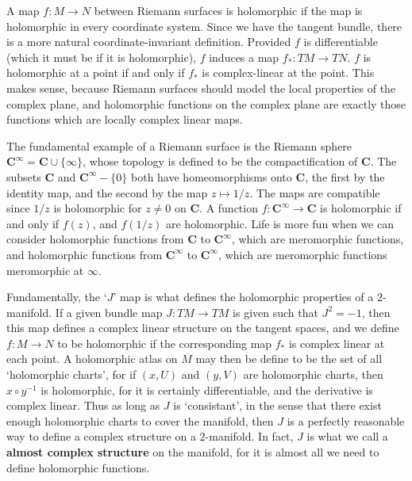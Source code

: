 A map $f: M \to N$ between Riemann surfaces is holomorphic if the map is holomorphic in every coordinate system. Since we have the tangent bundle, there is a more natural coordinate-invariant definition. Provided $f$ is differentiable (which it must be if it is holomorphic), $f$ induces a map $f_*: TM \to TN$. $f$ is holomorphic at a point if and only if $f_*$ is complex-linear at the point. This makes sense, because Riemann surfaces should model the local properties of the complex plane, and holomorphic functions on the complex plane are exactly those functions which are locally complex linear maps.

\begin{example}
    The fundamental example of a Riemann surface is the Riemann sphere $\mathbf{C}^\infty = \mathbf{C} \cup \{ \infty \}$, whose topology is defined to be the compactification of $\mathbf{C}$. The subsets $\mathbf{C}$ and $\mathbf{C}^\infty - \{ 0 \}$ both have homeomorphisms onto $\mathbf{C}$, the first by the identity map, and the second by the map $z \mapsto 1/z$. The maps are compatible since $1/z$ is holomorphic for $z \neq 0$ on $\mathbf{C}$. A function $f: \mathbf{C}^\infty \to \mathbf{C}$ is holomorphic if and only if $f(z)$, and $f(1/z)$ are holomorphic. Life is more fun when we can consider holomorphic functions from $\mathbf{C}$ to $\mathbf{C}^\infty$, which are meromorphic functions, and holomorphic functions from $\mathbf{C}^\infty$ to $\mathbf{C}^\infty$, which are meromorphic functions meromorphic at $\infty$.
\end{example}

Fundamentally, the `$J$' map is what defines the holomorphic properties of a $2$-manifold. If a given bundle map $J:TM \to TM$ is given such that $J^2 = -1$, then this map defines a complex linear structure on the tangent spaces, and we define $f: M \to N$ to be holomorphic if the corresponding map $f_*$ is complex linear at each point. A holomorphic atlas on $M$ may then be define to be the set of all `holomorphic charts', for if $(x,U)$ and $(y,V)$ are holomorphic charts, then $x \circ y^{-1}$ is holomorphic, for it is certainly differentiable, and the derivative is complex linear. Thus as long as $J$ is `consistant', in the sense that there exist enough holomorphic charts to cover the manifold, then $J$ is a perfectly reasonable way to define a complex structure on a $2$-manifold. In fact, $J$ is what we call a {\bf almost complex structure} on the manifold, for it is almost all we need to define holomorphic functions.

